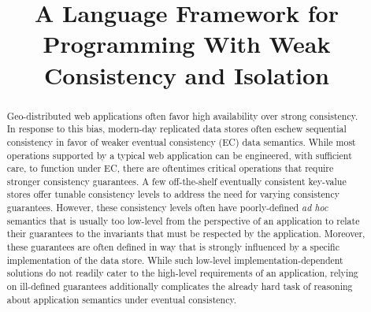\documentclass[11pt]{article}
\date{}
\begin{document}
\title{A Language Framework for Programming With Weak Consistency and
Isolation}


\maketitle

\begin{abstract}
Geo-distributed web applications often favor high availability over
strong consistency.  In response to this bias, modern-day replicated
data stores often eschew sequential consistency in favor of weaker
eventual consistency (EC) data semantics. While most operations
supported by a typical web application can be engineered, with
sufficient care, to function under EC, there are oftentimes critical
operations that require stronger consistency guarantees. A few
off-the-shelf eventually consistent key-value stores offer tunable
consistency levels to address the need for varying consistency
guarantees.  However, these consistency levels often have
poorly-defined \emph{ad hoc} semantics that is usually too low-level
from the perspective of an application to relate their guarantees to
the invariants that must be respected by the application.  Moreover,
these guarantees are often defined in way that is strongly influenced
by a specific implementation of the data store.  While such low-level
implementation-dependent solutions do not readily cater to the
high-level requirements of an application, relying on ill-defined
guarantees additionally complicates the already hard task of reasoning
about application semantics under eventual consistency.


\end{abstract}
\end{document}
